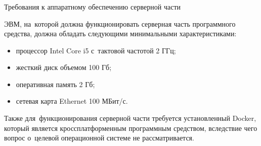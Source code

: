 \subsubsection{} Требования к аппаратному обеспечению серверной части
\label{sec:analysis:research:req:server_requirments}

ЭВМ, на~которой должна функционировать серверная часть программного средства, должна обладать следующими минимальными характеристиками:

\begin{itemize}
	\item процессор Intel Core i5 с~тактовой частотой 2 ГГц;
	\item жесткий диск объемом 100 Гб;
	\item оперативная память 2 Гб;
	\item сетевая карта Ethernet 100 МБит/с.
\end{itemize}

Также для~функционирования серверной части требуется установленный Docker, который является кроссплатформенным программным средством, вследствие чего вопрос о~целевой операционной системе не рассматривается.